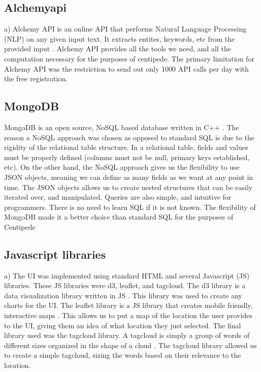 \documentclass[conference]{IEEEtran}
\begin{document}
\subsection{Alchemyapi}

a)  Alchemy API is an online API that performs Natural Language Processing (NLP) on any given input text. It extracts entites, keywords, etc from the provided input \cite{alchemyapi:alchemy}. Alchemy API provides all the tools we need, and all the computation necessary for the purposes of centipede. The primary limitation for Alchemy API was the restriction to send out only 1000 API calls per day with the free registration. 

\subsection{MongoDB}

MongoDB is an open source, NoSQL based database written in C++ \cite{mongo:mongodb}. The reason a NoSQL approach was chosen as opposed to standard SQL is due to the rigidity of the relational table structure. In a relational table, fields and values must be properly defined (columns must not be null, primary keys established, etc). On the other hand, the NoSQL approach gives us the flexibility to use JSON objects, meaning we can define as many fields as we want at any point in time. The JSON objects allows us to create nested structures that can be easily iterated over, and manipulated. Queries are also simple, and intuitive for programmers. There is no need to learn SQL if it is not known. The flexibility of MongoDB made it a better choice than standard SQL for the purposes of Centipede

\subsection{Javascript libraries}

a)  The UI was implemented using standard HTML and several Javascript (JS) libraries. These JS libraries were d3, leaflet, and tagcloud. The d3 library is a data visualization library written in JS \cite{bostock:dthree}. This library was used to create any charts for the UI. The leaflet library is a JS library that creates mobile friendly, interactive maps \cite{agafonkin:leaflet}. This allows us to put a map of the location the user provides to the UI, giving them an idea of what location they just selected. The final library used was the tagcloud library. A tagcloud is simply a group of words of different sizes organized in the shape of a cloud \cite{groves:tagcloud}. The tagcloud library allowed us to create a simple tagcloud, sizing the words based on their relevance to the location. 
\end{document}

